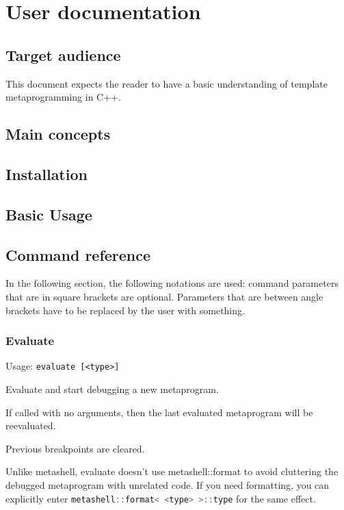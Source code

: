 

\chapter{User documentation}

\section{Target audience}

This document expects the reader to have a basic understanding of template
metaprogramming in C++.

\section{Main concepts}

\section{Installation}

\section{Basic Usage}

\section{Command reference}

In the following section, the following notations are used: command parameters
that are in square brackets are optional. Parameters that are between angle
brackets have to be replaced by the user with something.

\subsection*{Evaluate}

Usage: \lstinline$evaluate [<type>]$

Evaluate and start debugging a new metaprogram.

If called with no arguments, then the last evaluated metaprogram will
be reevaluated.

Previous breakpoints are cleared.

Unlike metashell, evaluate doesn't use metashell::format to avoid
cluttering the debugged metaprogram with unrelated code. If you need
formatting, you can explicitly enter
\lstinline[language=C++]|metashell::format< <type> >::type| for the same
effect.

